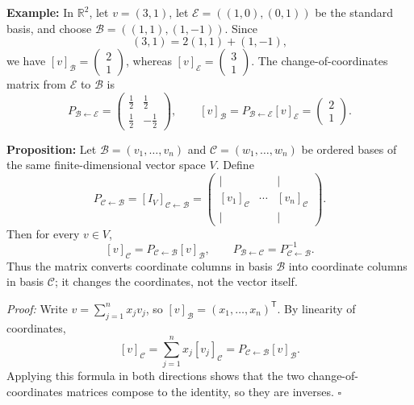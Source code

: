 \documentclass[a4paper,11pt,abstract=true]{scrartcl}
\theoremstyle{dotlessP}
\theoremstyle{dotlessS}
\theoremstyle{remark}
\theoremstyle{definition}
\begin{document}
\begin{example_box}
\textbf{Example:} In
$\mathbb{R}^2$, let $v=(3,1)$, let
$\mathcal{E}=((1,0),(0,1))$ be the standard basis, and choose
$\mathcal{B}=((1,1),(1,-1))$. Since
\[
(3,1)=2(1,1)+(1,-1),
\]
we have ${[v]}_{\mathcal{B}}=\begin{pmatrix}2\\1\end{pmatrix}$,
whereas ${[v]}_{\mathcal{E}}=\begin{pmatrix}3\\1\end{pmatrix}$.
The change-of-coordinates matrix from $\mathcal{E}$ to $\mathcal{B}$ is
\[
P_{\mathcal{B}\leftarrow\mathcal{E}}
=\begin{pmatrix}\frac12&\frac12\\[2pt]\frac12&-\frac12\end{pmatrix},
\qquad
{[v]}_{\mathcal{B}}
=P_{\mathcal{B}\leftarrow\mathcal{E}}{[v]}_{\mathcal{E}}
=\begin{pmatrix}2\\1\end{pmatrix}.
\]
\end{example_box}

\begin{problem_box}
\textbf{Proposition:} Let
$\mathcal{B}=(v_1,\ldots,v_n)$ and $\mathcal{C}=(w_1,\ldots,w_n)$ be
ordered bases of the same finite-dimensional vector space $V$. Define
\[
P_{\mathcal{C}\leftarrow\mathcal{B}}
={[I_V]}_{\mathcal{C}\leftarrow\mathcal{B}}
=\begin{pmatrix}
|& &|\\
{[v_1]}_{\mathcal{C}}&\cdots&{[v_n]}_{\mathcal{C}}\\
|& &|
\end{pmatrix}.
\]
Then for every $v\in V$,
\[
{[v]}_{\mathcal{C}}
=P_{\mathcal{C}\leftarrow\mathcal{B}}{[v]}_{\mathcal{B}},
\qquad
P_{\mathcal{B}\leftarrow\mathcal{C}}
=P_{\mathcal{C}\leftarrow\mathcal{B}}^{-1}.
\]
Thus the matrix converts coordinate columns in basis $\mathcal{B}$ into
coordinate columns in basis $\mathcal{C}$; it changes the coordinates,
not the vector itself.
\end{problem_box}

\begin{claim_box}
\textit{Proof:} Write $v=\sum_{j=1}^n x_jv_j$, so
${[v]}_{\mathcal{B}}=(x_1,\ldots,x_n)^{\mathsf T}$. By linearity of
coordinates,
\[
{[v]}_{\mathcal{C}}
=\sum_{j=1}^n x_j{[v_j]}_{\mathcal{C}}
=P_{\mathcal{C}\leftarrow\mathcal{B}}{[v]}_{\mathcal{B}}.
\]
Applying this formula in both directions shows that the two change-of-
coordinates matrices compose to the identity, so they are inverses.
\hfill$\square$
\end{claim_box}
\end{document}
